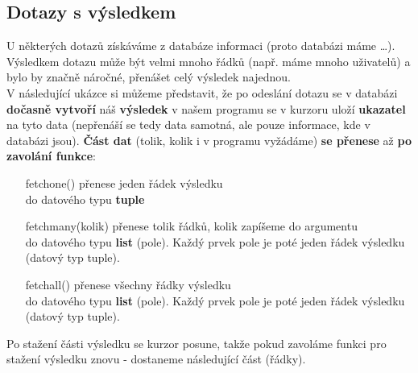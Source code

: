 \subsection{Dotazy s výsledkem}
U některých dotazů získáváme z databáze informaci (proto databázi máme \dots).\\
Výsledkem dotazu může být velmi mnoho řádků (např. máme mnoho uživatelů) a bylo by značně náročné, přenášet celý výsledek najednou.\\
V následující ukázce si můžeme představit, že po odeslání dotazu se v databázi \textbf{dočasně vytvoří} náš \textbf{výsledek} v našem programu se v kurzoru uloží \textbf{ukazatel} na tyto data (nepřenáší se tedy data samotná, ale pouze informace, kde v databázi jsou). \textbf{Část dat} (tolik, kolik i v programu vyžádáme) \textbf{se přenese} až \textbf{po zavolání funkce}:
\begin{itemize}
\item[fetchone()] přenese jeden řádek výsledku\\do datového typu \textbf{tuple}
\item[fetchmany(kolik)] přenese tolik řádků, kolik zapíšeme do argumentu\\do datového typu \textbf{list} (pole). Každý prvek pole je poté jeden řádek výsledku (datový typ tuple).
\item[fetchall()] přenese všechny řádky výsledku\\do datového typu \textbf{list} (pole). Každý prvek pole je poté jeden řádek výsledku (datový typ tuple).
\end{itemize}
Po stažení části výsledku se kurzor posune, takže pokud zavoláme funkci pro stažení výsledku znovu - dostaneme následující část (řádky).

